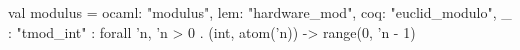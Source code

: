 val modulus = {ocaml: "modulus", lem: "hardware_mod", coq: "euclid_modulo", _ : "tmod_int"} : forall 'n, 'n > 0 .  (int, atom('n)) -> range(0, 'n - 1)
